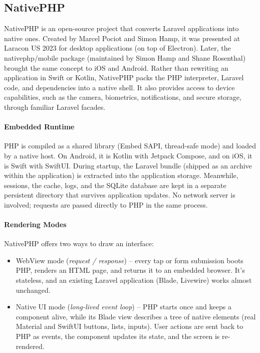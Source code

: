 
\subsection{NativePHP}
 \label{nativephp}

NativePHP is an open-source project that converts Laravel applications into native ones. Created
by Marcel Pociot and Simon Hamp, it was presented at Laracon US 2023 for desktop applications
(on top of Electron). Later, the nativephp/mobile package (maintained by Simon Hamp and Shane
Rosenthal) brought the same concept to iOS and Android. Rather than rewriting an application in
Swift or Kotlin, NativePHP packs the PHP interpreter, Laravel code, and dependencies into a
native shell. It also provides access to device capabilities, such as the camera, biometrics,
notifications, and secure storage, through familiar Laravel facades.

\paragraph{Embedded Runtime} PHP is compiled as a shared library (Embed SAPI, thread-safe mode)
and loaded by a native host. On Android, it is Kotlin with Jetpack Compose, and on iOS, it is
Swift with SwiftUI. During startup, the Laravel bundle (shipped as an archive within the
application) is extracted into the application storage. Meanwhile, sessions, the cache, logs,
and the SQLite database are kept in a separate persistent directory that survives application
updates. No network server is involved; requests are passed directly to PHP in the same process.

\paragraph{Rendering Modes} NativePHP offers two ways to draw an interface:

\begin{itemize}
  \item WebView mode (\emph{request / response}) -- every tap or form submission boots PHP,
  renders an HTML page, and returns it to an embedded browser. It's stateless, and an existing
  Laravel application (Blade, Livewire) works almost unchanged.

  \item Native UI mode (\emph{long-lived event loop}) -- PHP starts once and keeps a component
  alive, while its Blade view describes a tree of native elements (real Material and SwiftUI
  buttons, lists, inputs). User actions are sent back to PHP as events, the component updates
  its state, and the screen is re-rendered.
\end{itemize}

